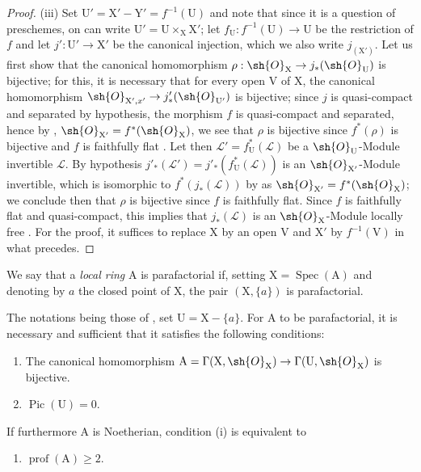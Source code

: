\begin{proof}
(iii) Set $\mathrm{U}'=\mathrm{X}'-\mathrm{Y}'=f^{-1}(\mathrm{U})$ and note that since it is a question of preschemes, on can write $\mathrm{U}'=\mathrm{U}\times_{\mathrm{X}}\mathrm{X}'$; let $f_{\mathrm{U}}:f^{-1}(\mathrm{U})\to\mathrm{U}$ be the restriction of $f$ and let $j':\mathrm{U}'\to\mathrm{X}'$ be the canonical injection, which we also write $j_{(\mathrm{X}')}$.
Let us first show that the canonical homomorphism $\rho:\sh{O}_{\mathrm{X}}\to j_*(\sh{O}_{\mathrm{U}})$ is bijective; for this, it is necessary that for every open $\mathrm{V}$ of $\mathrm{X}$, the canonical homomorphism $\sh{O}_{\mathrm{X}',x'}\to j'_*(\sh{O}_{\mathrm{U}'})$ is bijective; since $j$ is quasi-compact and separated by hypothesis, the morphism $f$ is quasi-compact and separated, hence by , $\sh{O}_{\mathrm{X}'}=f^*(\sh{O}_{\mathrm{X}})$, we see that $\rho$ is bijective since $f^*(\rho)$ is bijective and $f$ is faithfully flat .
Let then $\mathscr{L}'=f_{\mathrm{U}}^*(\mathscr{L})$ be a $\sh{O}_{\mathrm{U}}$-Module invertible $\mathscr{L}$.
By hypothesis $j'_*(\mathscr{L}')=j'_*(f_{\mathrm{U}}^*(\mathscr{L}))$ is an $\sh{O}_{\mathrm{X}'}$-Module invertible, which is isomorphic to $f^*(j_*(\mathscr{L}))$ by  as $\sh{O}_{\mathrm{X}'}=f^*(\sh{O}_{\mathrm{X}})$; we conclude then that $\rho$ is bijective since $f$ is faithfully flat.
Since $f$ is faithfully flat and quasi-compact, this implies that $j_*(\mathscr{L})$ is an $\sh{O}_{\mathrm{X}}$-Module locally free .
For the proof, it suffices to replace $\mathrm{X}$ by an open $\mathrm{V}$ and $\mathrm{X}'$ by $f^{-1}(\mathrm{V})$ in what precedes.
\end{proof}

\begin{definition}[21.13.7]
\label{IV.21.13.7}
We say that a \emph{local ring} $\mathrm{A}$ is parafactorial if, setting $\mathrm{X}=\operatorname{Spec}(\mathrm{A})$ and denoting by $a$ the closed point of $\mathrm{X}$, the pair $(\mathrm{X},\{a\})$ is parafactorial.
\end{definition}

\begin{proposition}[21.13.8]
\label{IV.21.13.8}
The notations being those of , set $\mathrm{U}=\mathrm{X}-\{a\}$.
For $\mathrm{A}$ to be parafactorial, it is necessary and sufficient that it satisfies the following conditions:
\begin{enumerate}[label=(\roman*)]
  \item The canonical homomorphism $\mathrm{A}=\Gamma(\mathrm{X},\sh{O}_{\mathrm{X}})\to\Gamma(\mathrm{U},\sh{O}_{\mathrm{X}})$ is bijective.
  \item $\operatorname{Pic}(\mathrm{U})=0$.
\end{enumerate}

If furthermore $\mathrm{A}$ is Noetherian, condition (i) is equivalent to
\begin{enumerate}
  \item[\textup{(i bis)}] $\operatorname{prof}(\mathrm{A})\geq 2$.
\end{enumerate}
\end{proposition}

